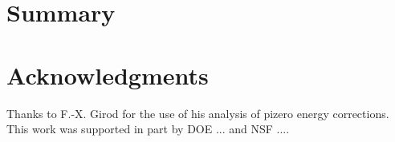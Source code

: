 \section{Summary}

\section*{Acknowledgments}

Thanks to F.-X. Girod for the use of his analysis of pizero energy corrections.
This work was supported in part by DOE ... and NSF ....




